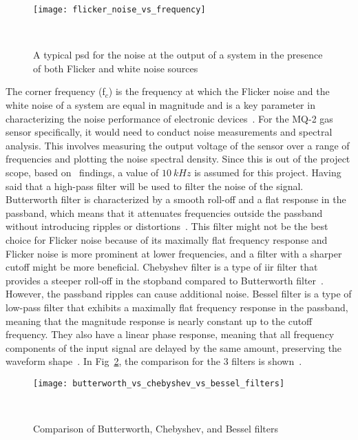 \begin{figure}[H]
    \centering
    \texttt{[image: flicker\_noise\_vs\_frequency]}
    \caption{A typical \acrshort{psd} for the noise at the output of a system in the presence of both Flicker and white noise sources}
~\label{fig:flicker_noise_vs_frequency}
\end{figure}

The corner frequency (f$_{c}$) is the frequency at which the Flicker noise and the white noise of a system are equal in magnitude and is a key parameter in characterizing the noise performance of electronic devices~\cite{smulko_2024}. For the MQ-2 gas sensor specifically, it would need to conduct noise measurements and spectral analysis. This involves measuring the output voltage of the sensor over a range of frequencies and plotting the noise spectral density. Since this is out of the project scope, based on~\cite{smulko_2024} findings, a value of $10~kHz$ is assumed for this project. Having said that a high-pass filter will be used to filter the noise of the signal. \\

Butterworth filter is characterized by a smooth roll-off and a flat response in the passband, which means that it attenuates frequencies outside the passband without introducing ripples or distortions~\cite{ruofei_2021}. This filter might not be the best choice for Flicker noise because of its maximally flat frequency response and Flicker noise is more prominent at lower frequencies, and a filter with a sharper cutoff might be more beneficial. Chebyshev filter is a type of \acrfull{iir} filter that provides a steeper roll-off in the stopband compared to Butterworth filter~\cite{podder_2014}. However, the passband ripples can cause additional noise. Bessel filter is a type of low-pass filter that exhibits a maximally flat frequency response in the passband, meaning that the magnitude response is nearly constant up to the cutoff frequency. They also have a linear phase response, meaning that all frequency components of the input signal are delayed by the same amount, preserving the waveform shape~\cite{ashu_2021}. In Fig~\ref{fig:butterworth_vs_chebyshev_vs_bessel_filters}, the comparison for the 3 filters is shown~\cite{kikkert_2008}. \\

\begin{figure}[H]
    \centering
    \texttt{[image: butterworth\_vs\_chebyshev\_vs\_bessel\_filters]}
    \caption{Comparison of Butterworth, Chebyshev, and Bessel filters}
~\label{fig:butterworth_vs_chebyshev_vs_bessel_filters}
\end{figure}

